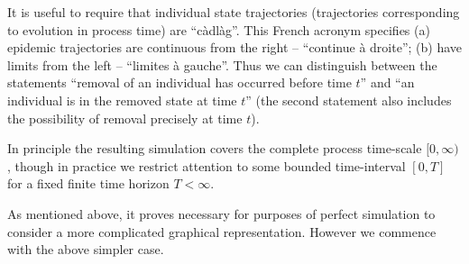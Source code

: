 \documentclass[]{article}
\newcommand{\SIR}{\emph{SIR}\xspace}
\begin{document}
 
It is useful to
 require that
 individual state trajectories 
 (trajectories corresponding to evolution in process time)
 are ``c\`adl\`ag''. 
This French acronym specifies (a) epidemic trajectories are continuous 
 from the right -- ``continue \`a droite'';
(b) have limits from the left -- ``limites \`a gauche''.
Thus we can distinguish between
 the statements
 ``removal of an individual has occurred before time \(t\)''
 and ``an individual is in the removed state 
 at time \(t\)'' (the second statement also
 includes the possibility of removal precisely at time \(t\)).
 
In principle the resulting simulation covers the complete process time-scale \([0,\infty)\),
 though
 in practice we 
 restrict attention to some bounded time-interval \([0,T]\) for a fixed 
 finite time horizon \(T<\infty\).


  As mentioned above, 
  it proves necessary 
  for purposes of perfect simulation
  to consider a more complicated graphical representation.
 However we commence with the above simpler case.
 
\end{document}
